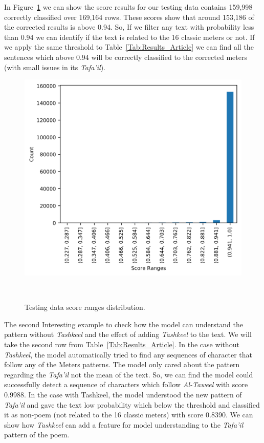 
In Figure~\ref{Fig:Results_Distribution} we can show the score results for our testing data contains 159,998 correctly classified over 169,164 rows. These scores show that around 153,186 of the corrected results is above 0.94. So, If we filter any text with probability less than 0.94 we can identify if the text is related to the 16 classic meters or not. If we apply the same threshold to Table~\ref{Tab:Results_Article} we can find all the sentences which above 0.94 will be correctly classified to the corrected meters (with small issues in its \textit{Tafa’il}).

\begin{figure}[!t]
 \includegraphics{./Figures/Ch_7_Results/IMG_Result_Distribution.png}
 \caption{Testing data score ranges distribution.}~\label{Fig:Results_Distribution}
\end{figure}

The second Interesting example to check how the model can understand the pattern without \textit{Tashkeel} and the effect of adding \textit{Tashkeel} to the text. We will take the second row from Table~\ref{Tab:Results_Article}. In the case without \textit{Tashkeel}, the model automatically tried to find any sequences of character that follow any of the Meters patterns. The model only cared about the pattern regarding the \textit{Tafa'il} not the mean of the text. So, we can find the model could successfully detect a sequence of characters which follow \textit{Al-Taweel} with score 0.9988. In the case with Tashkeel, the model understood the new pattern of \textit{Tafa'il} and gave the text low probability which below the threshold and classified it as non-poem (not related to the 16 classic meters) with score 0.8390. We can show how \textit{Tashkeel} can add a feature for model understanding to the \textit{Tafa'il} pattern of the poem.


